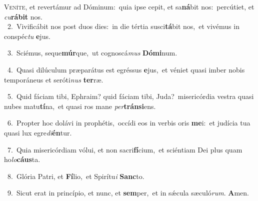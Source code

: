 \lettrine{\initial\textcolor{\initialcolor}{V}}{eníte,} et revertámur ad Dóminum:~\dagger quia ipse cepit, et sa\-\textbf{ná}\-bit nos:~\star percútiet, et \textit{cu}\-\textbf{rá}\textbf{bit} nos.\\
{\numbfont\textcolor{\numbcolor}{~2.}}~Vivificábit nos post duos dies:~\dagger in die tértia susci\-\textbf{tá}\-bit nos,~\star et vivémus in conspéc\textit{tu} \textbf{e}\-jus.\par
{\numbfont\textcolor{\numbcolor}{~3.}}~Sciémus, seque\-\textbf{múr}\-que,~\star ut cognoscá\textit{mus} \textbf{Dó}\-\textbf{mi}num.\par
{\numbfont\textcolor{\numbcolor}{~4.}}~Quasi dilúculum præparátus est egréssus \textbf{e}\-jus,~\star et véniet quasi imber nobis temporáneus et seróti\textit{nus} \textbf{ter}\-ræ.\par
{\numbfont\textcolor{\numbcolor}{~5.}}~Quid fáciam tibi, Ephraim? quid fáciam tibi, Juda?~\dagger misericórdia vestra quasi nubes matu\-\textbf{tí}\-na,~\star et quasi ros mane \textit{per}\-\textbf{tráns}\textbf{i}ens.\par
{\numbfont\textcolor{\numbcolor}{~6.}}~Propter hoc dolávi in prophétis,~\dagger occídi eos in verbis oris \textbf{me}\-i:~\star et judícia tua quasi lux egre\-\textit{di}\-\textbf{én}tur.\par
{\numbfont\textcolor{\numbcolor}{~7.}}~Quia misericórdiam vólui, et non sacri\-\textbf{fí}\-cium,~\star et sciéntiam Dei plus quam ho\-\textit{lo}\-\textbf{cáus}ta.\par
{\numbfont\textcolor{\numbcolor}{~8.}}~Glória Patri, et \textbf{Fí}\-lio,~\star et Spirítu\textit{i} \textbf{Sanc}\-to.\par
{\numbfont\textcolor{\numbcolor}{~9.}}~Sicut erat in princípio, et nunc, et \textbf{sem}\-per,~\star et in sǽcula sæculó\-\textit{rum}\-. \textbf{A}\-men.\par
